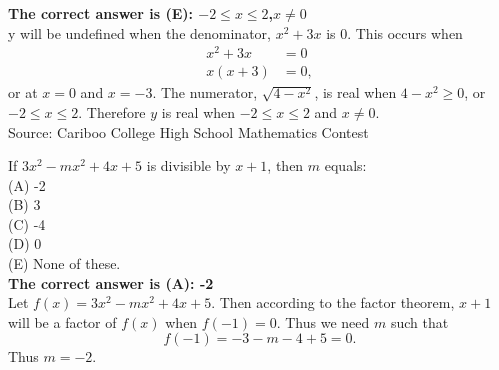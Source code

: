 \documentclass{article}
\begin{document}

\textbf{The correct answer is (E): $-2\leq x\leq 2$,$x\neq0$}\\[1 ex]
y will be undefined when the denominator, $x^2+3x$ is 0. This occurs when
\begin{align*}
x^2+3x&=0\\
x(x+3)&=0,
\end{align*}
or at $x=0$ and $x=-3$. The numerator, $\sqrt{4-x^2}$, is real when $4-x^2\geq0$, or $-2\leq x\leq 2$. Therefore $y$ is real when $-2\leq x\leq 2$ and $x\neq0$.
\\[5 ex]

\scriptsize
Source: Cariboo College High School Mathematics Contest

\normalsize
If $3x^2-mx^2+4x+5$ is divisible by $x+1$, then $m$ equals:\\
(A) -2\\
(B) 3\\
(C) -4\\
(D) 0\\
(E) None of these.\\


\textbf{The correct answer is (A): -2}\\[1 ex]
Let $f(x)=3x^2-mx^2+4x+5$. Then according to the factor theorem, $x+1$ will be a factor of $f(x)$ when $f(-1)=0$. Thus we need $m$ such that 
\begin{equation*}
f(-1)=-3-m-4+5=0.
\end{equation*}
Thus $m=-2$.
\\[5 ex]
\end{document}
